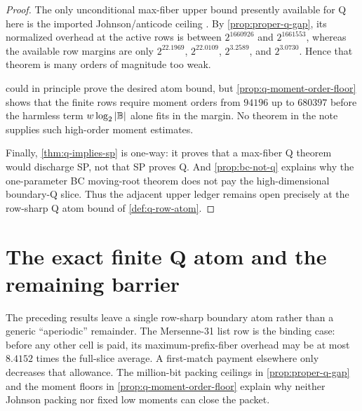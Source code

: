 \documentclass[11pt,a4paper]{amsart}
\numberwithin{equation}{section}
\theoremstyle{remark}
\begin{document}
\begin{proof}
The only unconditional max-fiber upper bound presently available for Q here is the imported Johnson/anticode ceiling \cite[Secs.~19--21]{CAP25v132}.  By \cref{prop:proper-q-gap}, its normalized overhead at the active rows is between \(2^{1660926}\) and \(2^{1661553}\), whereas the available row margins are only \(2^{22.1969}\), \(2^{22.0109}\), \(2^{3.2589}\), and \(2^{3.0730}\).  Hence that theorem is many orders of magnitude too weak.

 could in principle prove the desired atom bound, but \cref{prop:q-moment-order-floor} shows that the finite rows require moment orders from \(94196\) up to \(680397\) before the harmless term \(w\log_2|\mathbb B|\) alone fits in the margin.  No theorem in the note supplies such high-order moment estimates.

Finally, \cref{thm:q-implies-sp} is one-way: it proves that a max-fiber Q theorem would discharge SP, not that SP proves Q.  And \cref{prop:bc-not-q} explains why the one-parameter BC moving-root theorem does not pay the high-dimensional boundary-Q slice.  Thus the adjacent upper ledger remains open precisely at the row-sharp Q atom bound of \cref{def:q-row-atom}.
\end{proof}


\section{The exact finite Q atom and the remaining barrier}\label{sec:finite-q-barrier}
The preceding results leave a single row-sharp boundary atom rather than a generic ``aperiodic'' remainder.  The Mersenne-31 list row is the binding case: before any other cell is paid, its maximum-prefix-fiber overhead may be at most $8.4152$ times the full-slice average.  A first-match payment elsewhere only decreases that allowance.  The million-bit packing ceilings in \cref{prop:proper-q-gap} and the moment floors in \cref{prop:q-moment-order-floor} explain why neither Johnson packing nor fixed low moments can close the packet.
\end{document}
